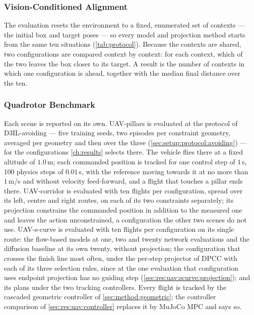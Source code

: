 \subsubsection{Vision-Conditioned Alignment}\label{sec:setup:protocol:aligning}

The evaluation resets the environment to a fixed, enumerated set of contexts --- the initial box and target
poses --- so every model and projection method starts from the same ten situations
(\autoref{tab:protocol}). Because the contexts are shared, two configurations are compared context by
context: for each context, which of the two leaves the box closer to its target. A result is the number of
contexts in which one configuration is ahead, together with the median final distance over the ten.

\subsubsection{Quadrotor Benchmark}\label{sec:setup:protocol:uav}

Each scene is reported on its own. UAV-pillars is evaluated at the protocol of D3IL-avoiding --- five
training seeds, two episodes per constraint geometry, averaged per geometry and then over the three
(\autoref{sec:setup:protocol:avoiding}) --- for the configurations \autoref{ch:results} selects there.
The vehicle flies there at a fixed altitude of $1.0$\,m; each commanded position is tracked for one
control step of $1$\,s, $100$ physics steps of $0.01$\,s, with the reference moving towards it at no more
than $1$\,m/s and without velocity feed-forward, and a flight that touches a pillar ends there. UAV-corridor is evaluated with ten flights per configuration, spread
over its left, centre and right routes, on each of its two constraints separately; its projection constrains the commanded position in addition to the measured one and leaves the
action unconstrained, a configuration the other two scenes do not use. UAV-s-curve is evaluated with ten
flights per configuration on its single route: the flow-based models at one, two and twenty network
evaluations and the diffusion baseline at its own twenty, without projection; the configuration that
crosses the finish line most often, under the per-step projector of \ac{DPCC} with each of its three
selection rules, since at the one evaluation that configuration uses endpoint projection has no guiding
step (\autoref{sec:res:uav:scurve:projection}); and its plans under the two tracking controllers. Every flight is tracked by the cascaded geometric
controller of \autoref{sec:method:geometric}; the controller comparison of
\autoref{sec:res:uav:controller} replaces it by MuJoCo MPC and says so.

